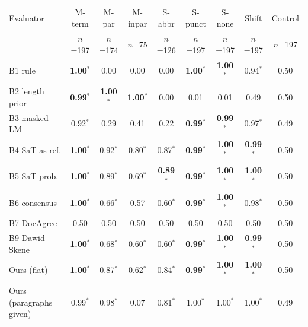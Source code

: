 \begin{tabular}{lcccccccc}
\toprule
Evaluator & M-term & M-par & M-inpar & S-abbr & S-punct & S-none & Shift & Control \\
 & {\tiny $n$=197} & {\tiny $n$=174} & {\tiny $n$=75} & {\tiny $n$=126} & {\tiny $n$=197} & {\tiny $n$=197} & {\tiny $n$=197} & {\tiny $n$=197} \\
\midrule
B1 rule & \textbf{1.00}$^*$ & 0.00 & 0.00 & 0.00 & \textbf{1.00}$^*$ & \textbf{1.00}$^*$ & 0.94$^*$ & 0.50 \\
B2 length prior & \textbf{0.99}$^*$ & \textbf{1.00}$^*$ & \textbf{1.00}$^*$ & 0.00 & 0.01 & 0.01 & 0.49 & 0.50 \\
B3 masked LM & 0.92$^*$ & 0.29 & 0.41 & 0.22 & \textbf{0.99}$^*$ & \textbf{0.99}$^*$ & 0.97$^*$ & 0.49 \\
B4 SaT as ref. & \textbf{1.00}$^*$ & 0.92$^*$ & 0.80$^*$ & 0.87$^*$ & \textbf{0.99}$^*$ & \textbf{1.00}$^*$ & \textbf{0.99}$^*$ & 0.50 \\
B5 SaT prob. & \textbf{1.00}$^*$ & 0.89$^*$ & 0.69$^*$ & \textbf{0.89}$^*$ & \textbf{0.99}$^*$ & \textbf{1.00}$^*$ & \textbf{1.00}$^*$ & 0.50 \\
B6 consensus & \textbf{1.00}$^*$ & 0.66$^*$ & 0.57 & 0.60$^*$ & \textbf{0.99}$^*$ & \textbf{1.00}$^*$ & 0.98$^*$ & 0.50 \\
B7 DocAgree & 0.50 & 0.50 & 0.50 & 0.50 & 0.50 & 0.50 & 0.50 & 0.50 \\
B9 Dawid--Skene & \textbf{1.00}$^*$ & 0.68$^*$ & 0.60$^*$ & 0.60$^*$ & \textbf{0.99}$^*$ & \textbf{1.00}$^*$ & \textbf{0.99}$^*$ & 0.50 \\
Ours (flat) & \textbf{1.00}$^*$ & 0.87$^*$ & 0.62$^*$ & 0.84$^*$ & \textbf{0.99}$^*$ & \textbf{1.00}$^*$ & \textbf{1.00}$^*$ & 0.50 \\
\midrule
Ours (paragraphs given) & 0.99$^*$ & 0.98$^*$ & 0.07 & 0.81$^*$ & 1.00$^*$ & 1.00$^*$ & 1.00$^*$ & 0.49 \\
\bottomrule
\end{tabular}
